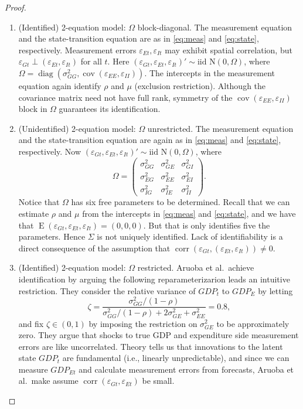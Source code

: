 \documentclass[oneside,reqno]{amsart}
\DeclareMathOperator{\E}{E}
\DeclareMathOperator{\cov}{cov}
\DeclareMathOperator{\corr}{corr}
\DeclareMathOperator{\diag}{diag}
\newcommand{\eps}{\varepsilon}
\newcommand{\N}{\mathrm N}
\theoremstyle{definition}
\begin{document}
\begin{enumerate}[label=(\roman*)]
\begin{proof}
\begin{enumerate}[label=(\arabic*)]
\item
(Identified) 2-equation model: $\Omega$ block-diagonal. The measurement equation and the state-transition equation are as in \eqref{eq:meas} and \eqref{eq:state}, respectively. Measurement errors $\eps_{Et}, \eps_{It}$ may exhibit spatial correlation, but $\eps_{Gt} \perp (\eps_{Et}, \eps_{It})$ for all $t$. Here $(\eps_{Gt}, \eps_{Et}, \eps_{It})' \sim \text{iid } \N(0, \Omega)$, where $\Omega = \diag(\sigma_{GG}^2, \cov(\eps_{EE}, \eps_{II}))$. The intercepts in the measurement equation again identify $\rho$ and $\mu$ (exclusion restriction). Although the covariance matrix need not have full rank, symmetry of the $\cov(\eps_{EE}, \eps_{II})$ block in $\Omega$ guarantees its identification.
\item
(Unidentified) 2-equation model: $\Omega$ unrestricted. The measurement equation and the state-transition equation are again as in \eqref{eq:meas} and \eqref{eq:state}, respectively. Now $(\eps_{Gt}, \eps_{Et}, \eps_{It})' \sim \text{iid } \N(0, \Omega)$, where
\begin{equation}\label{eq:unres-sigma}
	\Omega = \begin{pmatrix}
		\sigma_{GG}^2 & \sigma_{GE}^2 & \sigma_{GI}^2 \\
		\sigma_{EG}^2 & \sigma_{EE}^2 & \sigma_{EI}^2 \\
		\sigma_{IG}^2 & \sigma_{IE}^2 &  \sigma_{II}^2
	\end{pmatrix}.
\end{equation}
Notice that $\Omega$ has six free parameters to be determined. Recall that we can estimate $\rho$ and $\mu$ from the intercepts in \eqref{eq:meas} and \eqref{eq:state}, and we have that $\E(\eps_{Gt}, \eps_{Et}, \eps_{It}) = (0, 0, 0)$. But that is only identifies five the parameters. Hence $\Sigma$ is not uniquely identified. Lack of identifiability is a direct consequence of the assumption that $\corr(\eps_{Gt}, (\eps_{Et}, \eps_{It})) \neq 0$.
\item
(Identified) 2-equation model: $\Omega$ restricted. Aruoba et al.\ achieve identification by arguing the following reparameterizarion leads an intuitive restriction. They consider the relative variance of $GDP_t$ to $GDP_E$ by letting
\[
	\zeta = \frac{\sigma_{GG}^2/(1-\rho)}{\sigma_{GG}^2/(1-\rho) + 2 \sigma_{GE}^2 + \sigma_{EE}^2} = 0.8,
\]
and fix $\zeta \in (0,1)$ by imposing the restriction on $\sigma_{GE}^2$ to be approximately zero. They argue that  shocks to true GDP and expenditure side measurement errors are like uncorrelated. Theory tells us that innovations to the latent state $GDP_t$ are fundamental (i.e., linearly unpredictable), and since we can measure $GDP_{Et}$ and calculate measurement errors from forecasts, Aruoba et al.\ make assume $\corr(\eps_{ Gt}, \eps_{Et})$ be small. 

\end{enumerate}
\end{proof}
\end{enumerate}
\end{document}
